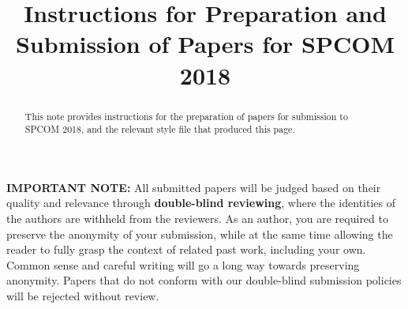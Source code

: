 \documentclass[10pt,conference]{IEEEtran}
\begin{document}
\title{Instructions for Preparation and Submission of Papers for SPCOM 2018}


\maketitle

\begin{abstract}
This note provides instructions for the preparation of papers
for submission to SPCOM 2018, and the relevant style file that produced
this page.
\end{abstract}

\vspace{.5in}
{\bf IMPORTANT NOTE:} All submitted papers will be judged based on their quality and relevance through {\bf double-blind reviewing}, where the identities of the authors are withheld from the reviewers. As an author, you are required to preserve the anonymity of your submission, while at the same time allowing the reader to fully grasp the context of related past work, including your own. Common sense and careful writing will go a long way towards preserving anonymity. Papers that do not conform with our double-blind submission policies will be rejected without review.
\end{document}
